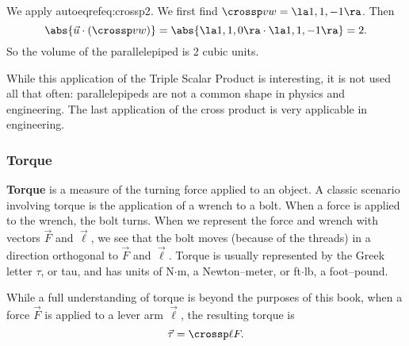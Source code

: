 {We apply autoeqref{eq:crossp2}. We first find $\crossp vw =\la 1,1,-1\ra$. Then
$$\abs{\vec u\cdot(\crossp vw)} = \abs{\la 1,1,0\ra \cdot \la1,1,-1\ra} = 2.$$
So the volume of the parallelepiped is 2 cubic units.
}

While this application of the Triple Scalar Product is interesting, it is not used all that often: parallelepipeds are not a common shape in physics and engineering. The last application of the cross product is very applicable in engineering.\\

\subsubsection*{Torque}

\textbf{Torque} is a measure of the turning force applied to an object. A classic scenario involving torque is the application of a wrench to a bolt. When a force is applied to the wrench, the bolt turns. When we represent the force and wrench with vectors $\vec F$ and $\vec \ell$, we see that the bolt moves (because of the threads) in a  direction orthogonal to $\vec F$ and $\vec \ell$. Torque is usually represented by the Greek letter $\tau$, or tau, and has units of N$\cdot$m, a Newton--meter, or ft$\cdot$lb, a foot--pound.

While a full understanding of torque is beyond the purposes of this book, when a force $\vec F$ is applied to a lever arm $\vec \ell$, the resulting torque is \begin{equation}\vec \tau = \crossp \ell F.\label{eq:crossp3}\end{equation}

